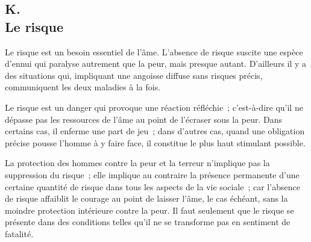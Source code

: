 \documentclass[french,twoside]{book} %
\begin{document}
\subsection[{K. Le risque}]{K. \\
Le risque}
\noindent \par
Le risque est un besoin essentiel de l'âme. L'absence de risque suscite une espèce d'ennui qui paralyse autrement que la peur, mais presque autant. D'ailleurs il y a des situations qui, impliquant une angoisse diffuse sans risques précis, communiquent les deux maladies à la fois.\par
Le risque est un danger qui provoque une réaction réfléchie ; c'est-à-dire qu'il ne dépasse pas les ressources de l'âme au point de l'écraser sous la peur. Dans certains cas, il enferme une part de jeu ; dans d'autres cas, quand une obligation précise pousse l'homme à y faire face, il constitue le plus haut stimulant possible.\par
La protection des hommes contre la peur et la terreur n'implique pas la suppression du risque ; elle implique au contraire la présence permanente d'une certaine quantité de risque dans tous les aspects de la vie sociale ; car l'absence de risque affaiblit le courage au point de laisser l'âme, le cas échéant, sans la moindre protection intérieure contre la peur. Il faut seulement que le risque se présente dans des conditions telles qu'il ne se transforme pas en sentiment de fatalité.
\end{document}
